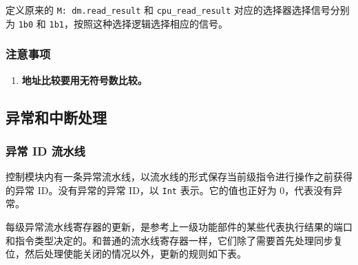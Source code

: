 \documentclass[12pt,AutoFakeBold,AutoFakeSlant]{article}
\providecommand{\tightlist}{%
  \setlength{\itemsep}{0pt}\setlength{\parskip}{0pt}}
\newcommand{\ms}[1]{\texttt{#1}}
\begin{document}
定义原来的 \texttt{M:\ dm.read\_result} 和 \texttt{cpu\_read\_result} 对应的选择器选择信号分别为 \texttt{1\textquotesingle{}b0} 和 \texttt{1\textquotesingle{}b1}，按照这种选择逻辑选择相应的信号。 

\subsubsection{注意事项}

\begin{enumerate}
\tightlist
\item
\textbf{地址比较要用无符号数比较。}
\end{enumerate}

\hypertarget{ux5f02ux5e38ux548cux4e2dux65adux5904ux7406}{%
\subsection{异常和中断处理}\label{ux5f02ux5e38ux548cux4e2dux65adux5904ux7406}}

\subsubsection{异常 ID 流水线}

控制模块内有一条异常流水线，以流水线的形式保存当前级指令进行操作之前获得的异常 ID。没有异常的异常 ID，以 \ms{Int} 表示。它的值也正好为 0，代表没有异常。

每级异常流水线寄存器的更新，是参考上一级功能部件的某些代表执行结果的端口和指令类型决定的。和普通的流水线寄存器一样，它们除了需要首先处理同步复位，然后处理使能关闭的情况以外，更新的规则如下表。
\end{document}
